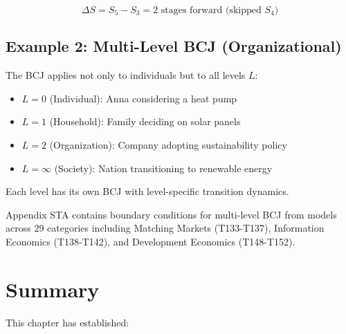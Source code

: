 \begin{equation}
\Delta S = S_5 - S_3 = 2 \text{ stages forward (skipped } S_4\text{)}
\label{eq:anna-transition}
\end{equation}

\subsection{Example 2: Multi-Level BCJ (Organizational)}

\begin{intuition}
The BCJ applies not only to individuals but to all levels $L$:
\begin{itemize}
    \item $L=0$ (Individual): Anna considering a heat pump
    \item $L=1$ (Household): Family deciding on solar panels
    \item $L=2$ (Organization): Company adopting sustainability policy
    \item $L=\infty$ (Society): Nation transitioning to renewable energy
\end{itemize}
Each level has its own BCJ with level-specific transition dynamics.
\end{intuition}

\begin{cross-reference}
Appendix STA contains boundary conditions for multi-level BCJ from
models across 29 categories including Matching Markets (T133-T137),
Information Economics (T138-T142), and Development Economics (T148-T152).
\end{cross-reference}



\section{Summary}
\label{sec:bcj-summary}


This chapter has established:

